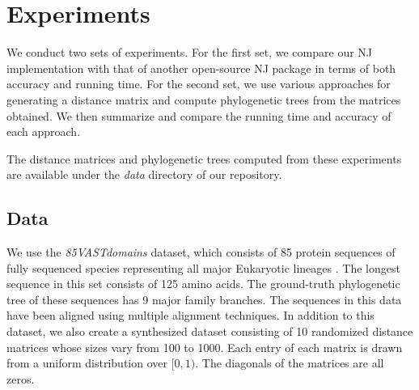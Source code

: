\documentclass[11pt,letterpaper]{article}
\theoremstyle{definition}
\begin{document}
\section{Experiments}

We conduct two sets of experiments. For the first set, we compare our NJ implementation with that of another open-source NJ package in terms of both accuracy and running time. For the second set, we use various approaches for generating a distance matrix and compute phylogenetic trees from the matrices obtained. We then summarize and compare the running time and accuracy of each approach. 




The distance matrices and phylogenetic trees computed from these experiments are available under the \textit{data} directory of our repository. 

\subsection{Data}

We use the \textit{85VASTdomains} dataset, which consists of 85 protein sequences of fully sequenced species representing all major Eukaryotic lineages \cite{khafif2014identification}. The longest sequence in this set consists of 125 amino acids. The ground-truth phylogenetic tree of these sequences has 9 major family branches. The sequences in this data have been aligned using multiple alignment techniques. In addition to this dataset, we also create a synthesized dataset consisting of 10 randomized distance matrices whose sizes vary from 100 to 1000. Each entry of each matrix is drawn from a uniform distribution over $[0, 1)$. The diagonals of the matrices are all zeros.   
\end{document}
